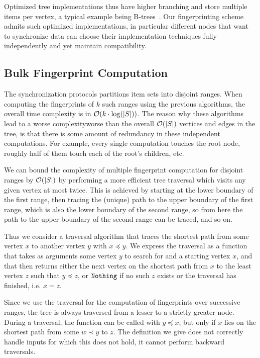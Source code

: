Optimized tree implementations thus have higher branching and store multiple items per vertex, a typical example being B-trees~\cite{bayer2002organization}. Our fingerprinting scheme admits such optimized implementations, in particular different nodes that want to synchronize data can choose their implementation techniques fully independently and yet maintain compatibility.

\subsection{Bulk Fingerprint Computation}
\label{bulk}

The synchronization protocols partitions item sets into disjoint ranges. When computing the fingerprints of $k$ such ranges using the previous algorithms, the overall time complexity is in $\mathcal{O}(k \cdot \log(|{S}|))$. The reason why these algorithms lead to a worse complexityworse than the overall $\mathcal{O}(|{S}|)$ vertices and edges in the tree, is that there is some amount of redundancy in these independent computations. For example, every single computation touches the root node, roughly half of them touch each of the root's children, etc.

We can bound the complexity of multiple fingerprint computation for disjoint ranges by $\mathcal{O}(|{S}|)$ by performing a more efficient tree traversal which visits any given vertex at most twice. This is achieved by starting at the lower boundary of the first range, then tracing the (unique) path to the upper boundary of the first range, which is also the lower boundary of the second range, so from here the path to the upper boundary of the second range can be traced, and so on.

Thus we consider a traversal algorithm that traces the shortest path from some vertex $x$ to another vertex $y$ with $x \preceq y$. We express the traversal as a function that takes as arguments some vertex $y$ to search for and a starting vertex $x$, and that then returns either the next vertex on the shortest path from $x$ to the least vertex $z$ such that $y \preceq z$, or $\mathtt{Nothing}$ if no such $z$ exists or the traversal has finished, i.e. $x = z$.

Since we use the traversal for the computation of fingerprints over successive ranges, the tree is always traversed from a lesser to a strictly greater node. During a traversal, the function can be called with $y \preceq x$, but only if $x$ lies on the shortest path from some $w \prec y$ to $z$. The definition we give does not correctly handle inputs for which this does not hold, it cannot perform backward traversals.

